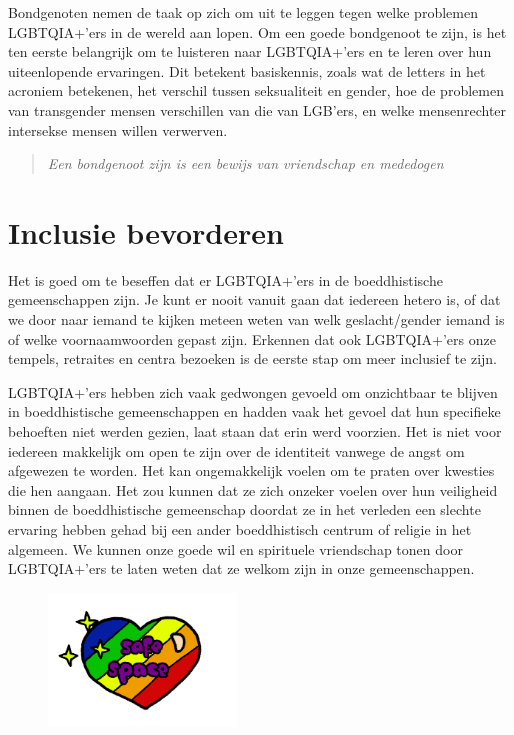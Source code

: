 \documentclass[12pt,openany]{book}
\begin{document}
Bondgenoten nemen de taak op zich om uit te leggen tegen welke problemen LGBTQIA+’ers in de wereld aan lopen. Om een goede bondgenoot te zijn, is het ten eerste belangrijk om te luisteren naar LGBTQIA+’ers en te leren over hun uiteenlopende ervaringen. Dit betekent basiskennis, zoals wat de letters in het acroniem betekenen, het verschil tussen seksualiteit en gender, hoe de problemen van transgender mensen verschillen van die van LGB’ers, en welke mensenrechter intersekse mensen willen verwerven.

\begin{quote}
\textit{Een bondgenoot zijn is een bewijs van vriendschap en mededogen}
\end{quote}

\section*{Inclusie bevorderen}

Het is goed om te beseffen dat er LGBTQIA+’ers in de boeddhistische gemeenschappen zijn. Je kunt er nooit vanuit gaan dat iedereen hetero is, of dat we door naar iemand te kijken meteen weten van welk geslacht/gender iemand is of welke voornaamwoorden gepast zijn. Erkennen dat ook LGBTQIA+’ers onze tempels, retraites en centra bezoeken is de eerste stap om meer inclusief te zijn.

LGBTQIA+’ers hebben zich vaak gedwongen gevoeld om onzichtbaar te blijven in boeddhistische gemeenschappen en hadden vaak het gevoel dat hun specifieke behoeften niet werden gezien, laat staan dat erin werd voorzien.  Het is niet voor iedereen makkelijk om open te zijn over de identiteit vanwege de angst om afgewezen te worden. Het kan ongemakkelijk voelen om te praten over kwesties die hen aangaan. Het zou kunnen dat ze zich onzeker voelen over hun veiligheid binnen de boeddhistische gemeenschap doordat ze in het verleden een slechte ervaring hebben gehad bij een ander boeddhistisch centrum of religie in het algemeen. We kunnen onze goede wil en spirituele vriendschap tonen door LGBTQIA+’ers te laten weten dat ze welkom zijn in onze gemeenschappen.

\begin{figure}[h]
\includegraphics[width=5cm]{12.png}
\centering
\end{figure}
\end{document}
